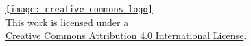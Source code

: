 %
%

\doublecol
	\onecolumngrid
\fi

\vspace*{180pt}
\begin{center}
	\href{http://creativecommons.org/licenses/by/4.0/}{\texttt{[image: creative\_commons\_logo]}}\\
	This work is licensed under a\\ \href{http://creativecommons.org/licenses/by/4.0/}{Creative Commons Attribution 4.0 International License}.
\end{center}
\newpage

\doublecol
	\twocolumngrid
\fi
